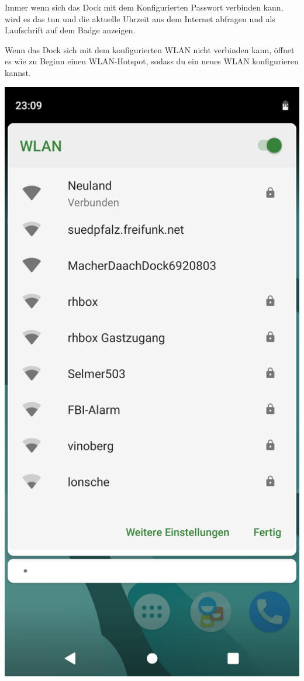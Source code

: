 \documentclass{article}
\begin{document}
Immer wenn sich das Dock mit dem Konfigurierten Passwort verbinden kann, wird es das tun und die aktuelle Uhrzeit aus dem Internet abfragen und als Laufschrift auf dem Badge anzeigen.

Wenn das Dock sich mit dem konfigurierten WLAN nicht verbinden kann, öffnet es wie zu Beginn einen WLAN-Hotspot, sodass du ein neues WLAN konfigurieren kannst.

\vspace{1cm}

\begin{minipage}[b]{0.5\textwidth}
	\includegraphics[width=\textwidth]{Bilder2019/Screenshot_20190918-230918_Nova_Launcher.png}
\end{minipage}
\end{document}
